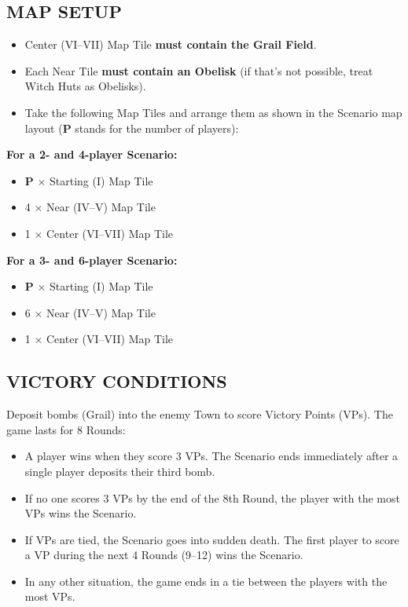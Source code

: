\begin{multicols}{2}
\subsection*{\MakeUppercase{Map Setup}}
\begin{itemize}
  \item Center (VI--VII) Map Tile \textbf{must contain the Grail Field}.
  \item Each Near Tile \textbf{must contain an Obelisk} (if that's not possible, treat Witch Huts as Obelisks).
  \item Take the following Map Tiles and arrange them as shown in the Scenario map layout ($\boldsymbol{P}$ stands for the number of players):
\end{itemize}

\textbf{For a 2- and 4-player Scenario:}
\begin{itemize}
  \item $\boldsymbol{P}$ × Starting (I) Map Tile
  \item 4 × Near (IV--V) Map Tile
  \item 1 × Center (VI--VII) Map Tile
\end{itemize}

\textbf{For a 3- and 6-player Scenario:}
\begin{itemize}
  \item $\boldsymbol{P}$ × Starting (I) Map Tile
  \item 6 × Near (IV--V) Map Tile
  \item 1 × Center (VI--VII) Map Tile
\end{itemize}

\subsection*{\MakeUppercase{Victory Conditions}}

Deposit bombs (Grail) into the enemy Town to score Victory Points (VPs).
The game lasts for 8 Rounds:
\begin{itemize}
  \item A player wins when they score 3 VPs. The Scenario ends immediately after a single player deposits their third bomb.
  \item If no one scores 3 VPs by the end of the 8th Round, the player with the most VPs wins the Scenario.
  \item If VPs are tied, the Scenario goes into sudden death. The first player to score a VP during the next 4 Rounds (9--12) wins the Scenario.
  \newpage
  \item In any other situation, the game ends in a tie between the players with the most VPs.
\end{itemize}


\end{multicols}
